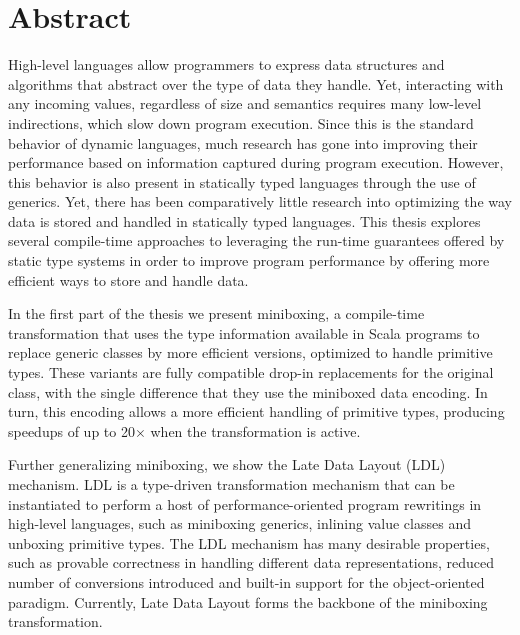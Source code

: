 \begingroup
\let\cleardoublepage\clearpage

\cleardoublepage
\chapter*{Abstract}

\vspace{0.5em}

High-level languages allow programmers to express data structures and algorithms that abstract over the type of data they handle. Yet, interacting with any incoming values, regardless of size and semantics requires many low-level indirections, which slow down program execution. Since this is the standard behavior of dynamic languages, much research has gone into improving their performance based on information captured during program execution. However, this behavior is also present in statically typed languages through the use of generics. Yet, there has been comparatively little research into optimizing the way data is stored and handled in statically typed languages. This thesis explores several compile-time approaches to leveraging the run-time guarantees offered by static type systems in order to improve program performance by offering more efficient ways to store and handle data.

\vspace{0.5em}

In the first part of the thesis we present miniboxing, a compile-time transformation that uses the type information available in Scala programs to replace generic classes by more efficient versions, optimized to handle primitive types. These variants are fully compatible drop-in replacements for the original class, with the single difference that they use the miniboxed data encoding. In turn, this encoding allows a more efficient handling of primitive types, producing speedups of up to 20$\times$ when the transformation is active.

\vspace{0.5em}

Further generalizing miniboxing, we show the Late Data Layout (LDL) mechanism. LDL is a type-driven transformation mechanism that can be instantiated to perform a host of performance-oriented program rewritings in high-level languages, such as miniboxing generics, inlining value classes and unboxing primitive types. The LDL mechanism has many desirable properties, such as provable correctness in handling different data representations, reduced number of conversions introduced and built-in support for the object-oriented paradigm. Currently, Late Data Layout forms the backbone of the miniboxing transformation.

